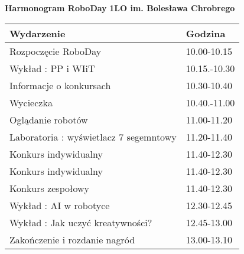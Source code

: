 \documentclass{article}
\begin{document}
\begin{center}
\Large\textbf{Harmonogram RoboDay}
\large\textbf{1LO im. Bolesława Chrobrego}
\end{center}
\vspace{1cm}
\begin{center}
\begin{tabular}{|l|l|}
\hline
\textbf{Wydarzenie} & \textbf{Godzina} \\
\hline
Rozpoczęcie RoboDay & 10.00-10.15 \\
\hline
Wykład : PP i WIiT & 10.15.-10.30 \\
\hline
Informacje o konkursach & 10.30-10.40 \\
\hline
Wycieczka & 10.40.-11.00 \\
\hline
Oglądanie robotów & 11.00-11.20 \\
\hline
Laboratoria : wyświetlacz 7 segemntowy & 11.20-11.40 \\
\hline
Konkurs indywidualny & 11.40-12.30 \\
\hline
Konkurs indywidualny & 11.40-12.30 \\
\hline
Konkurs zespołowy & 11.40-12.30 \\
\hline
Wykład : AI w robotyce & 12.30-12.45 \\
\hline
Wykład : Jak uczyć kreatywności? & 12.45-13.00 \\
\hline
Zakończenie i rozdanie nagród & 13.00-13.10 \\
\hline
\end{tabular}
\end{center}
\end{document}
